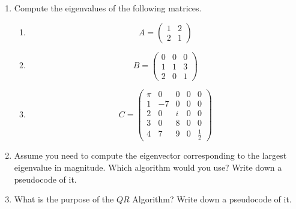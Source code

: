 \vspace*{-0.5cm}
\begin{enumerate}
\item Compute the eigenvalues of the following matrices.

\begin{enumerate}
	\item 
	$$
	A = \begin{pmatrix}
	1&2\\
	2&1
	\end{pmatrix}
	$$
	\item
	$$
	B = \begin{pmatrix}
	0&0&0\\
	1&1&3\\
	2&0&1
	\end{pmatrix}
	$$
	\item 
	$$C=
	\begin{pmatrix}
	\pi& 0& 0& 0 &0\\
	1 & -7&  0& 0 &0\\
	2 & 0& i  & 0 &0\\
	3 & 0& 8  & 0 & 0\\
	4 & 7& 9& 0& \frac{1}{2}
	\end{pmatrix}
	$$
\end{enumerate}
\item Assume you need to compute the eigenvector corresponding to the largest eigenvalue in magnitude. Which algorithm would you use? Write down a pseudocode of it.
\item What is the purpose of the $QR$ Algorithm? Write down a pseudocode of it.
%
%

\end{enumerate}

